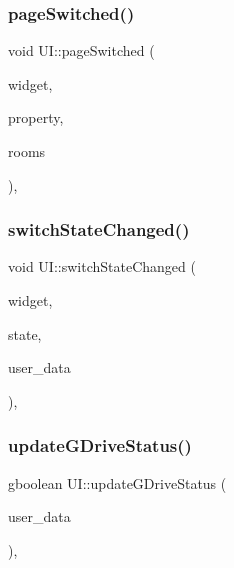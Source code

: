 \subsubsection{\texorpdfstring{page\+Switched()}{pageSwitched()}}
{\footnotesize\ttfamily void U\+I\+::page\+Switched (\begin{DoxyParamCaption}\item[{Gtk\+Widget $\ast$}]{widget,  }\item[{G\+Param\+Spec $\ast$}]{property,  }\item[{vector$<$ \hyperlink{class_room}{Room} $\ast$$>$ $\ast$}]{rooms }\end{DoxyParamCaption})\hspace{0.3cm}{\ttfamily [static]}, {\ttfamily [private]}}

\mbox{\label{class_u_i_ad4a8a785914011267c9cba9ebe92cd23}} 
\subsubsection{\texorpdfstring{switch\+State\+Changed()}{switchStateChanged()}}
{\footnotesize\ttfamily void U\+I\+::switch\+State\+Changed (\begin{DoxyParamCaption}\item[{Gtk\+Widget $\ast$}]{widget,  }\item[{gboolean}]{state,  }\item[{gpointer}]{user\+\_\+data }\end{DoxyParamCaption})\hspace{0.3cm}{\ttfamily [static]}, {\ttfamily [private]}}

\mbox{\label{class_u_i_af5cf1161c6d50b6e1b1fbcfb6123e10f}} 
\subsubsection{\texorpdfstring{update\+G\+Drive\+Status()}{updateGDriveStatus()}}
{\footnotesize\ttfamily gboolean U\+I\+::update\+G\+Drive\+Status (\begin{DoxyParamCaption}\item[{gpointer}]{user\+\_\+data }\end{DoxyParamCaption})\hspace{0.3cm}{\ttfamily [static]}, {\ttfamily [private]}}

